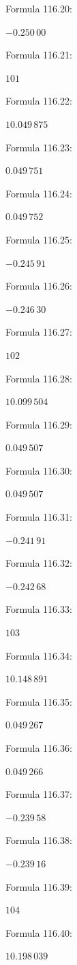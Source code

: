 \documentclass[11pt]{article}
\begin{document}
\noindent Formula 116.20:\par
$-0.250\,00$\par
\noindent Formula 116.21:\par
$101$\par
\noindent Formula 116.22:\par
$10.049\,875$\par
\noindent Formula 116.23:\par
$0.049\,751$\par
\noindent Formula 116.24:\par
$0.049\,752$\par
\noindent Formula 116.25:\par
$-0.245\,91$\par
\noindent Formula 116.26:\par
$-0.246\,30$\par
\noindent Formula 116.27:\par
$102$\par
\noindent Formula 116.28:\par
$10.099\,504$\par
\noindent Formula 116.29:\par
$0.049\,507$\par
\noindent Formula 116.30:\par
$0.049\,507$\par
\noindent Formula 116.31:\par
$-0.241\,91$\par
\noindent Formula 116.32:\par
$-0.242\,68$\par
\noindent Formula 116.33:\par
$103$\par
\noindent Formula 116.34:\par
$10.148\,891$\par
\noindent Formula 116.35:\par
$0.049\,267$\par
\noindent Formula 116.36:\par
$0.049\,266$\par
\noindent Formula 116.37:\par
$-0.239\,58$\par
\noindent Formula 116.38:\par
$-0.239\,16$\par
\noindent Formula 116.39:\par
$104$\par
\noindent Formula 116.40:\par
$10.198\,039$\par
\end{document}
